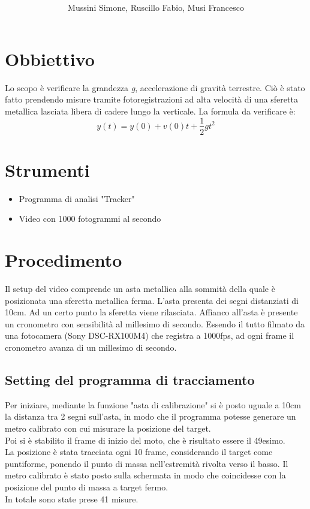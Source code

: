 \documentclass[12pt, a4paper]{article}
\title{\textbf{\scalebox{1.3}{\text{Moto di un grave lungo la verticale}}}}
\date{}
\author{\begin{small}Mussini Simone, Ruscillo Fabio, Musi Francesco\end{small}}
\begin{document}
\maketitle
\section{Obbiettivo}
Lo scopo è verificare la grandezza \textit{g}, accelerazione di gravità terrestre. 
Ciò è stato fatto prendendo misure tramite fotoregistrazioni ad alta velocità di una sferetta metallica lasciata libera di cadere lungo la verticale. 
La formula da verificare è:
\begin{equation*}
    y(t) = y(0) + v(0)t + \frac{1}{2}gt^2
\end{equation*}


\section{Strumenti}
\begin{itemize}
\setlength\itemsep{0mm}
    \item Programma di analisi "Tracker"
    \item Video con 1000 fotogrammi al secondo
\end{itemize}

\section{Procedimento}
Il setup del video comprende un asta metallica alla sommità della quale è posizionata una sferetta metallica ferma. L'asta presenta dei segni distanziati di 10cm. 
Ad un certo punto la sferetta viene rilasciata. Affianco all'asta è presente un cronometro con sensibilità al millesimo di secondo. 
Essendo il tutto filmato da una fotocamera (Sony DSC-RX100M4) che registra a 1000fps, ad ogni frame il cronometro avanza di un millesimo di secondo.

  
\subsection{Setting del programma di tracciamento}
Per iniziare, mediante la funzione "asta di calibrazione" si è posto uguale a 10cm la distanza tra 2 segni sull'asta, in modo che il programma potesse generare un metro calibrato con cui misurare la posizione del target. \\
Poi si è stabilito il frame di inizio del moto, che è risultato essere il 49esimo.  \\
La posizione è stata tracciata ogni 10 frame, considerando il target come puntiforme, ponendo il punto di massa nell'estremità rivolta verso il basso. Il metro calibrato è stato posto sulla schermata in modo che coincidesse con la posizione del punto di massa a target fermo.\\
In totale sono state prese 41 misure. 
\end{document}
